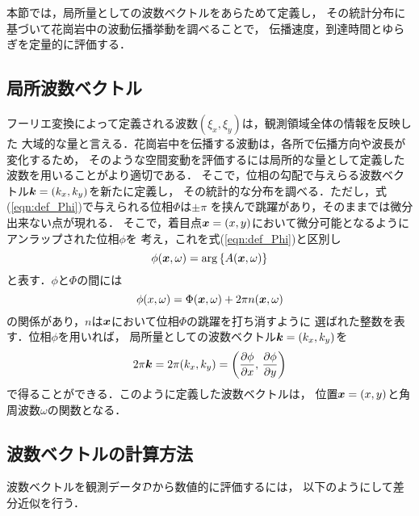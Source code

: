 ﻿本節では，局所量としての波数ベクトルをあらためて定義し，
その統計分布に基づいて花崗岩中の波動伝播挙動を調べることで，
伝播速度，到達時間とゆらぎを定量的に評価する．
\subsection{局所波数ベクトル}
フーリエ変換によって定義される波数$(\xi_x,\xi_y)$は，観測領域全体の情報を反映した
大域的な量と言える．花崗岩中を伝播する波動は，各所で伝播方向や波長が変化するため，
そのような空間変動を評価するには局所的な量として定義した波数を用いることがより適切である．
そこで，位相の勾配で与えらる波数ベクトル$\mbox{\boldmath{$k$}}=(k_x,k_y)$を新たに定義し，
その統計的な分布を調べる．ただし，式(\ref{eqn:def_Phi})で与えられる位相$\Phi$は$\pm \pi$
を挟んで跳躍があり，そのままでは微分出来ない点が現れる．
そこで，着目点$\mbox{\boldmath{$x$}}=(x,y)$において微分可能となるようにアンラップされた位相$\phi$を
考え，これを式(\ref{eqn:def_Phi})と区別し
\begin{equation}
	\phi(\fat{x},\omega)=\arg\left\{  A(\fat{x},\omega) \right\}
	\label{eqn:def_phi}
\end{equation}
と表す．$\phi$と$\Phi$の間には
\begin{equation}
	\phi(x,\omega)=\Phi(\fat{x},\omega) + 2\pi n(\fat{x},\omega )
	\label{eqn:unwrap}
\end{equation}
の関係があり，$n$は$\mbox{\boldmath{$x$}}$において位相$\Phi$の跳躍を打ち消すように
選ばれた整数を表す．位相$\phi$を用いれば，
局所量としての波数ベクトル$\mbox{\boldmath{$k$}}=(k_x,k_y)$を
\begin{equation}
	2\pi \fat{k}= 
	2\pi (k_x,k_y)=
	\left(
		\frac{\partial \phi}{\partial x}
		, \, 
		\frac{\partial \phi}{\partial y} 
	\right)
	\label{eqn:}
\end{equation}
で得ることができる．このように定義した波数ベクトルは，
位置$\mbox{\boldmath{$x$}}=(x,y)$と角周波数$\omega$の関数となる．
\subsection{波数ベクトルの計算方法}
波数ベクトルを観測データ$\cal D$から数値的に評価するには，
以下のようにして差分近似を行う．

